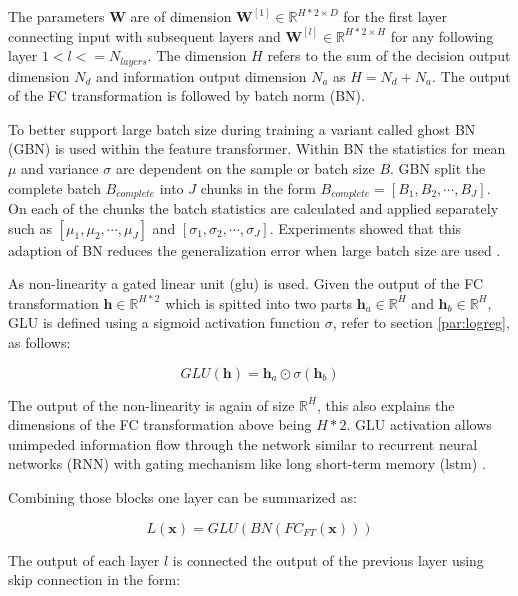 \documentclass[../main.tex]{subfiles}
\begin{document}
The parameters $\mathbf{W}$ are of dimension $\mathbf{W}^{[1]} \in \mathbb{R}^{H*2 \times D}$ for the first layer connecting input with subsequent layers and $\mathbf{W}^{[l]} \in \mathbb{R}^{H*2 \times H}$ for any following layer $1<l<=N_{layers}$. The dimension $H$ refers to the sum of the decision output dimension $N_d$ and information output dimension $N_a$ as $H = N_d+N_a$. The output of the FC transformation is followed by batch norm (BN). 
\newline

To better support large batch size during training a variant called ghost BN (GBN) is used within the feature transformer. Within BN the statistics for mean $\mu$ and variance $\sigma$ are dependent on the sample or batch size $B$. GBN split the complete batch $B_{complete}$ into $J$ chunks in the form $B_{complete}=[B_1, B_2, \cdots, B_J]$. On each of the chunks the batch statistics are calculated and applied separately such as $[\mu_1, \mu_2, \cdots, \mu_J]$ and $[\sigma_1, \sigma_2, \cdots, \sigma_J]$. Experiments showed that this adaption of BN reduces the generalization error when large batch size are used \cite{hoffer_train_2017}. 
\newline

As non-linearity a gated linear unit (\acs{glu}) \cite{dauphin_language_2017} is used. Given the output of the FC transformation $\mathbf{h} \in \mathbb{R}^{H * 2}$ which is spitted into two parts $\mathbf{h}_a \in \mathbb{R}^H$ and $\mathbf{h}_b \in \mathbb{R}^H$, GLU is defined using a sigmoid activation function $\sigma$, refer to section \ref{par:logreg}, as follows:

\begin{equation}
    GLU(\mathbf{h}) = \mathbf{h}_a \odot \sigma(\mathbf{h}_b)
\end{equation}

The output of the non-linearity is again of size $\mathbb{R}^H$, this also explains the dimensions of the FC transformation above being $H*2$. GLU activation allows unimpeded information flow through the network similar to recurrent neural networks (RNN) with gating mechanism like long short-term memory (\acs{lstm}) \cite{hochreiter_long_1997}. 

Combining those blocks one layer can be summarized as:

\begin{equation}
    L(\mathbf{x}) = GLU(BN(FC_{FT}(\mathbf{x})))
\end{equation}

The output of each layer $l$ is connected the output of the previous layer using skip connection in the form:
\end{document}
